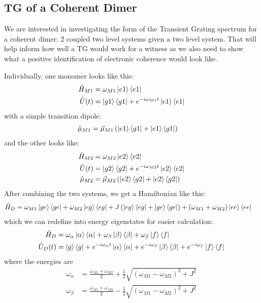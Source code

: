 \subsection{TG of a Coherent Dimer}
We are interested in investigating the form of the Transient Grating spectrum for a coherent dimer: 2 coupled two level systems given a two level system.  That will help inform how well a TG would work for a witness as we also need to show what a positive identification of electronic coherence would look like.

Individually, one monomer looks like this:
\begin{align*}
	\hat{H}_{M1} &= \omega_{M1} \ket{e1}\bra{e1} \\
	\hat{U}(t) &= \ket{g1}\bra{g1} + e^{-i \omega_{M1} t}\ket{e1}\bra{e1}
\end{align*}
with a simple transition dipole:
\begin{align*}
	\hat{\mu}_{M1} &= \vec{\mu}_{M1} \left( \ket{e1}\bra{g1} +  \ket{e1}\bra{g1}  \right)
\end{align*}
and the other looks like:
\begin{align*}
	\hat{H}_{M2} &= \omega_{M2} \ket{e2}\bra{e2} \\
	\hat{U}(t) &= \ket{g2}\bra{g2} + e^{-i \omega_{M2} t}\ket{e2}\bra{e2} \\
	\hat{\mu}_{M2} &= \vec{\mu}_{M2} \left( \ket{e2}\bra{g2} +  \ket{e2}\bra{g2}  \right)
\end{align*}
After combining the two systems, we get a Hamiltonian like this:
\begin{align*}
	\hat{H}_D &= \omega_{M1}\ket{ge}\bra{ge} + \omega_{M2}\ket{eg}\bra{eg} + J\left(\ket{eg}\bra{eg} + \ket{ge}\bra{ge} \right) + \left( \omega_{M1}+\omega_{M2} \right) \ket{ee}\bra{ee}
\end{align*}
which we can redefine into energy eigenstates for easier calculation:
\begin{align*}
	\hat{H}_D &= \omega_{\alpha}\ket{\alpha}\bra{\alpha} + \omega_{\beta}\ket{\beta}\bra{\beta} + \omega_{f} \ket{f}\bra{f} \\
	\hat{U}_D (t) &= \ket{g}\bra{g} + e^{-i\omega_{\alpha} t}\ket{\alpha}\bra{\alpha} + e^{-i\omega_{\beta}}\ket{\beta}\bra{\beta} +e^{-i \omega_{f} }\ket{f}\bra{f}
\end{align*}
where the energies are
\begin{align}
	\omega_{\alpha} &= \frac{\omega_{M1} + \omega_{M2}}{2} + \frac{1}{2}\sqrt{\left( \omega_{M1} - \omega_{M2} \right)^2 + J^2}\\
	\omega_{\beta} &= \frac{\omega_{M1} + \omega_{M2}}{2} - \frac{1}{2}\sqrt{\left( \omega_{M1} - \omega_{M2} \right)^2 + J^2}
\end{align}

